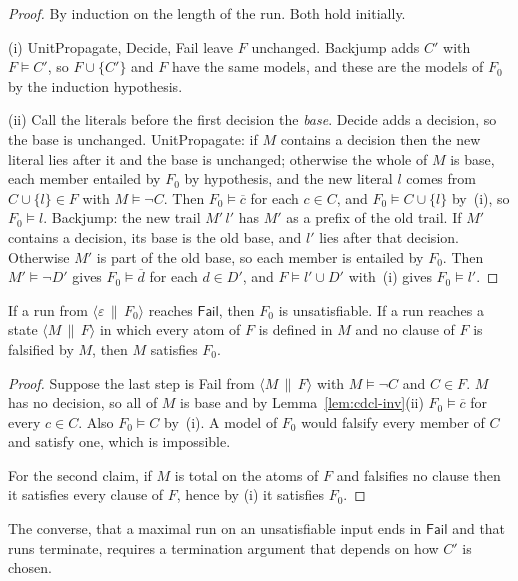 \begin{proof}
By induction on the length of the run. Both hold initially.

(i) \textsf{UnitPropagate}, \textsf{Decide}, \textsf{Fail} leave $F$ unchanged. \textsf{Backjump} adds $C'$ with $F\models C'$, so $F\cup\{C'\}$ and $F$ have the same models, and these are the models of $F_0$ by the induction hypothesis.

(ii) Call the literals before the first decision the \emph{base}. \textsf{Decide} adds a decision, so the base is unchanged. \textsf{UnitPropagate}: if $M$ contains a decision then the new literal lies after it and the base is unchanged; otherwise the whole of $M$ is base, each member entailed by $F_0$ by hypothesis, and the new literal $l$ comes from $C\cup\{l\}\in F$ with $M\models\neg C$. Then $F_0\models\overline{c}$ for each $c\in C$, and $F_0\models C\cup\{l\}$ by~(i), so $F_0\models l$. \textsf{Backjump}: the new trail $M'\,l'$ has $M'$ as a prefix of the old trail. If $M'$ contains a decision, its base is the old base, and $l'$ lies after that decision. Otherwise $M'$ is part of the old base, so each member is entailed by $F_0$. Then $M'\models\neg D'$ gives $F_0\models\overline{d}$ for each $d\in D'$, and $F\models l'\cup D'$ with~(i) gives $F_0\models l'$.
\end{proof}

\begin{theorem}
\label{thm:cdcl-sound}
If a run from $\langle\varepsilon\,\|\,F_0\rangle$ reaches $\mathsf{Fail}$, then $F_0$ is unsatisfiable. If a run reaches a state $\langle M\,\|\,F\rangle$ in which every atom of $F$ is defined in $M$ and no clause of $F$ is falsified by $M$, then $M$ satisfies $F_0$.
\end{theorem}

\begin{proof}
Suppose the last step is \textsf{Fail} from $\langle M\,\|\,F\rangle$ with $M\models\neg C$ and $C\in F$. $M$ has no decision, so all of $M$ is base and by Lemma~\ref{lem:cdcl-inv}(ii) $F_0\models\overline{c}$ for every $c\in C$. Also $F_0\models C$ by~(i). A model of $F_0$ would falsify every member of $C$ and satisfy one, which is impossible.

For the second claim, if $M$ is total on the atoms of $F$ and falsifies no clause then it satisfies every clause of $F$, hence by (i) it satisfies $F_0$.
\end{proof}

The converse, that a maximal run on an unsatisfiable input ends in $\mathsf{Fail}$ and that runs terminate, requires a termination argument that depends on how $C'$ is chosen.

